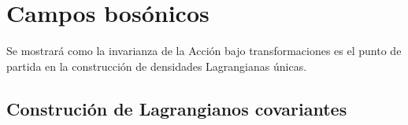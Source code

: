 \chapter{Campos bosónicos}
\label{cha:campos-vectoriales} %

 Se mostrará como la invarianza de la Acción bajo transformaciones es el punto de partida en la construcción de densidades Lagrangianas únicas.


\section{Construción de Lagrangianos covariantes}

